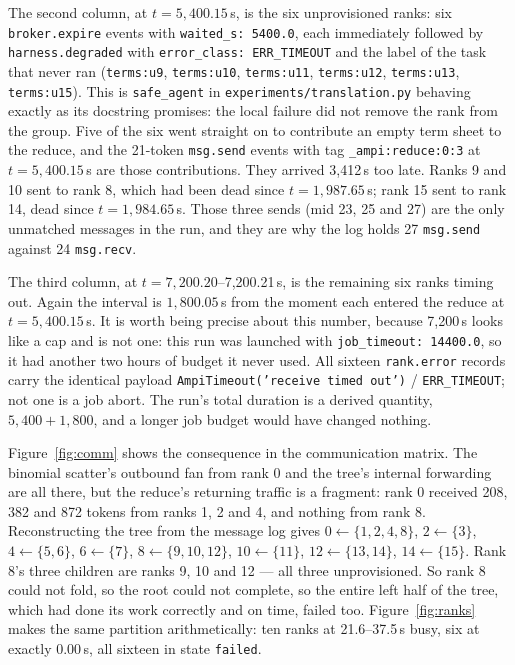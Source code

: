 \documentclass[11pt]{article}
\begin{document}
The second column, at $t = 5{,}400.15$\,s, is the six unprovisioned ranks: six
\texttt{broker.expire} events with \texttt{waited\_s: 5400.0}, each immediately followed
by \texttt{harness.degraded} with \texttt{error\_class: ERR\_TIMEOUT} and the label of
the task that never ran (\texttt{terms:u9}, \texttt{terms:u10}, \texttt{terms:u11},
\texttt{terms:u12}, \texttt{terms:u13}, \texttt{terms:u15}). This is
\texttt{safe\_agent} in \texttt{experiments/translation.py} behaving exactly as its
docstring promises: the local failure did not remove the rank from the group. Five of the
six went straight on to contribute an empty term sheet to the reduce, and the
21-token \texttt{msg.send} events with tag \texttt{\_ampi:reduce:0:3} at $t=5{,}400.15$\,s
are those contributions. They arrived 3{,}412\,s too late. Ranks 9 and 10 sent to rank 8,
which had been dead since $t=1{,}987.65$\,s; rank 15 sent to rank 14, dead since
$t=1{,}984.65$\,s. Those three sends (mid 23, 25 and 27) are the only unmatched messages
in the run, and they are why the log holds 27 \texttt{msg.send} against 24
\texttt{msg.recv}.

The third column, at $t = 7{,}200.20$--7{,}200.21\,s, is the remaining six ranks timing
out. Again the interval is $1{,}800.05$\,s from the moment each entered the reduce at
$t=5{,}400.15$\,s. It is worth being precise about this number, because 7{,}200\,s looks
like a cap and is not one: this run was launched with \texttt{job\_timeout: 14400.0}, so
it had another two hours of budget it never used. All sixteen \texttt{rank.error} records
carry the identical payload \texttt{AmpiTimeout('receive timed out')} /
\texttt{ERR\_TIMEOUT}; not one is a job abort. The run's total duration is a derived
quantity, $5{,}400 + 1{,}800$, and a longer job budget would have changed nothing.

Figure~\ref{fig:comm} shows the consequence in the communication matrix. The binomial
scatter's outbound fan from rank 0 and the tree's internal forwarding are all there, but
the reduce's returning traffic is a fragment: rank 0 received 208, 382 and 872 tokens
from ranks 1, 2 and 4, and nothing from rank 8. Reconstructing the tree from the message
log gives $0 \leftarrow \{1,2,4,8\}$, $2 \leftarrow \{3\}$, $4 \leftarrow \{5,6\}$, $6
\leftarrow \{7\}$, $8 \leftarrow \{9,10,12\}$, $10 \leftarrow \{11\}$, $12 \leftarrow
\{13,14\}$, $14 \leftarrow \{15\}$. Rank 8's three children are ranks 9, 10 and 12 ---
all three unprovisioned. So rank 8 could not fold, so the root could not complete, so
the entire left half of the tree, which had done its work correctly and on time, failed
too. Figure~\ref{fig:ranks} makes the same partition arithmetically: ten ranks at
21.6--37.5\,s busy, six at exactly 0.00\,s, all sixteen in state \texttt{failed}.
\end{document}
